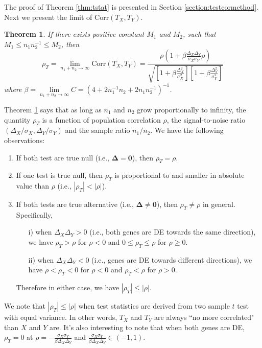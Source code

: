 \documentclass[12pt, a4paper]{article}
\newtheorem{theorem}{Theorem}       %
\newcommand{\cor}{\text{Corr}}
\begin{document}
	The proof of Theorem \ref{thm:tstat} is presented in Section \ref{section:testcormethod}. Next 
	we present the limit of $\cor(T_X, T_Y)$.
	\begin{theorem}\label{thm:rholimit}
	  	If there exists positive constant $M_1$ and $M_2$, such that $M_1 \leq n_1n_2^{-1}\leq M_2$, then
	   \begin{equation}\label{eq:limitT}
	   \rho_T=\lim\limits_{n_1 + n_2 \rightarrow \infty} \cor(T_X, T_Y) = \frac{\rho(1  +
	   	\beta\frac{\Delta_X\Delta_Y}{\sigma_X\sigma_Y}\rho)}{\sqrt{  \left[ 1 +\beta\frac{\Delta_X^2}{\sigma_X^2}\right]\left[ 1 + \beta\frac{\Delta_Y^2}{\sigma_Y^2}\right]}}
	   \end{equation}
	   where %
	   $\beta = \lim\limits_{n_1 + n_2 \rightarrow \infty}C = (4 + 2n_1^{-1}n_2 + 2n_1n_2^{-1})^{-1}$.
	\end{theorem}
	Theorem \ref{thm:rholimit} says that as long as $n_1$ and $n_2$ grow proportionally to 
	infinity, the quantity $\rho_T$ is a function of population correlation $\rho$, the 
	signal-to-noise ratio $(\Delta_X/\sigma_X, \Delta_Y/\sigma_Y)$  and the sample ratio $n_1/n_2$. 
	We have the following observations:
	\begin{enumerate}
		\item If both test are true null (i.e., $\bm \Delta = \bm 0$), then $\rho_T = \rho$.
		\item If one test is true null, then $\rho_T$ is proportional to and smaller in absolute value than $\rho$ (i.e., $|\rho_T|< |\rho|$).
		\item If both tests are true alternative (i.e., $\bm \Delta \neq \bm 0$), then $\rho_T\neq \rho$ in general. Specifically,
			\begin{enumerate}
				\item[i)]  when $\Delta_X\Delta_Y >0$ (i.e., both genes are DE towards the same direction), we have $\rho_T>\rho$ for $\rho <0$ and $0 \leq \rho_T \leq\rho$ for $\rho \geq 0$.
				\item[ii)] when $\Delta_X\Delta_Y <0$ (i.e., genes are DE towards different directions), we have
				$\rho <\rho_T<0$ for $\rho <0$ and $\rho_T<\rho$ for $\rho>0$.
			\end{enumerate}
		Therefore in either case, we have $|\rho_T| \leq |\rho|$. 
		\end{enumerate}
		
	We note that $|\rho_T| \leq |\rho|$ when test statistics are derived from two sample $t$ test 
	with equal variance. In other words, $T_X$ and $T_Y$ are always ``no more correlated" than $X$ 
	and $Y$ are. It's also interesting to note that when both genes are DE, $\rho_T=0$ at $\rho 
	=-\frac{\sigma_X\sigma_Y}{\beta\Delta_X\Delta_Y} $ and 
	$\frac{\sigma_X\sigma_Y}{\beta\Delta_X\Delta_Y} \in (-1, 1)$.
			
\end{document}
